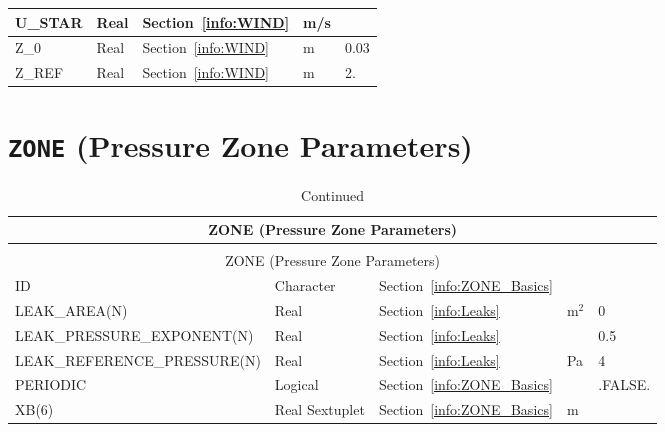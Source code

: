 \documentclass[11pt]{book}
\begin{document}
\begin{longtable}{@{\extracolsep{\fill}}|l|l|l|l|l|}
{\ct U\_STAR}                                   & Real          & Section~\ref{info:WIND}                       & m/s           &                   \\ \hline
{\ct Z\_0}                                      & Real          & Section~\ref{info:WIND}                       & m             & 0.03              \\ \hline
{\ct Z\_REF}                                    & Real          & Section~\ref{info:WIND}                       & m             & 2.                \\ \hline
\end{longtable}

\vspace{\baselineskip}


\section{\texorpdfstring{{\tt ZONE}}{ZONE} (Pressure Zone Parameters)}

\begin{longtable}{@{\extracolsep{\fill}}|l|l|l|l|l|}
\caption[Pressure zone parameters ({\ct ZONE} namelist group)]{For more information see Section~\ref{info:ZONE}.}
\label{tbl:ZONE} \\
\hline
\multicolumn{5}{|c|}{{\ct ZONE} (Pressure Zone Parameters)} \\
\hline \hline
\endfirsthead
\caption[]{Continued} \\
\hline
\multicolumn{5}{|c|}{{\ct ZONE} (Pressure Zone Parameters)} \\
\hline \hline
\endhead
{\ct ID}                    & Character         & Section~\ref{info:ZONE_Basics}     &        &               \\ \hline
{\ct LEAK\_AREA(N)}         & Real              & Section~\ref{info:Leaks}           & m$^2$  & 0             \\ \hline
{\ct LEAK\_PRESSURE\_EXPONENT(N)} & Real              & Section~\ref{info:Leaks}           &        & 0.5           \\ \hline
{\ct LEAK\_REFERENCE\_PRESSURE(N)} & Real              & Section~\ref{info:Leaks}           & Pa     & 4             \\ \hline
{\ct PERIODIC}              & Logical           & Section~\ref{info:ZONE_Basics}     &        & {\ct .FALSE.} \\ \hline
{\ct XB(6)}                 & Real Sextuplet    & Section~\ref{info:ZONE_Basics}     & m      &               \\ \hline
\end{longtable}
\end{document}
